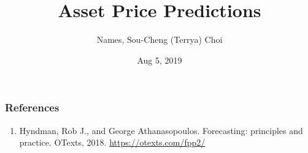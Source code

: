 \documentclass[12pt]{beamer}
\title[Asset Price Predictions]{Asset Price Predictions}
\author[Team Name]{Names, Sou-Cheng (Terrya) Choi}
\institute[IIT]{IIT Applied Mathematics 
}
\date[IIT SCI 498]{Aug 5, 2019\\[1ex]\red{IIT SCI 498}}
\begin{document}
\frame{\titlepage}

 

\begin{frame}
\frametitle{References}
\tiny
\begin{enumerate}

\item Hyndman, Rob J., and George Athanasopoulos. Forecasting: principles and practice. OTexts, 2018. \url{https://otexts.com/fpp2/}
\end{enumerate}

\end{frame}
\end{document}
